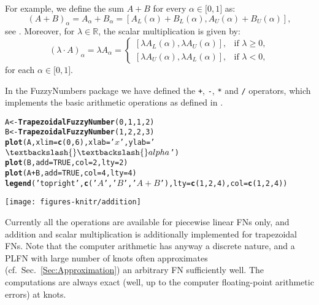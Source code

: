 \documentclass[11pt]{article}\usepackage{graphicx, color}
\makeatletter
\newcommand{\hlfunctioncall}[1]{\textcolor[rgb]{0.501960784313725,0,0.329411764705882}{\textbf{#1}}}%
\newcommand{\hlstring}[1]{\textcolor[rgb]{0.6,0.6,1}{#1}}%
\newenvironment{kframe}{%
 \def\at@end@of@kframe{}%
 \ifinner\ifhmode%
  \def\at@end@of@kframe{\end{minipage}}%
  \begin{minipage}{\columnwidth}%
 \fi\fi%
 \def\FrameCommand##1{\hskip\@totalleftmargin \hskip-\fboxsep
 \colorbox{shadecolor}{##1}\hskip-\fboxsep
     \hskip-\linewidth \hskip-\@totalleftmargin \hskip\columnwidth}%
 \MakeFramed {\advance\hsize-\width
   \@totalleftmargin\z@ \linewidth\hsize
   \@setminipage}}%
 {\par\unskip\endMakeFramed%
 \at@end@of@kframe}
\newenvironment{knitrout}{}{} %
\newcommand{\package}[1]{\textsf{#1}\xspace}
\makeatother
\begin{document}
For example, we define the sum $A+B$  for every
$\alpha \in \lbrack 0,1]$ as:%
\[
\left( A+B\right) _{\alpha }=A_{\alpha }+B_{\alpha }=\left[ A_{L}\left(
\alpha \right) +B_{L}\left( \alpha \right) ,A_{U}\left( \alpha \right)
+B_{U}\left( \alpha \right) \right],
\]%
see \cite{DuboisPrade1978:opfn,DiamondKloeden1994:metricspacesfs}.
Moreover, for $\lambda \in \mathbb{R}$,
the scalar multiplication is given by:
\[
\left( \lambda \cdot A\right) _{\alpha }=\lambda A_{\alpha }=\left\{ 
\begin{array}{ll}
\left[ \lambda A_{L}\left( \alpha \right) ,\lambda A_{U}\left( \alpha
\right) \right] , & \text{if }\lambda \geq 0, \\ 
\left[ \lambda A_{U}\left( \alpha \right) ,\lambda A_{L}\left( \alpha
\right) \right] , & \text{if }\lambda <0,%
\end{array}%
\right. 
\]%
for each $\alpha \in \lbrack 0,1]$.



In the \package{FuzzyNumbers} package we have defined
the \texttt{+}, \texttt{-}, \texttt{*} and \texttt{/} operators,
which implements the basic arithmetic operations
as defined in \cite{KlirYuan1995:fuzzybook}.


\begin{knitrout}\small
{}\color{fgcolor}\begin{kframe}
\begin{alltt}
A <- \hlfunctioncall{TrapezoidalFuzzyNumber}(0, 1, 1, 2)
B <- \hlfunctioncall{TrapezoidalFuzzyNumber}(1, 2, 2, 3)
\hlfunctioncall{plot}(A, xlim=\hlfunctioncall{c}(0,6), xlab=\hlstring{'$x$'}, ylab=\hlstring{'$\textbackslash{}\textbackslash{}alpha$'})
\hlfunctioncall{plot}(B, add=TRUE, col=2, lty=2)
\hlfunctioncall{plot}(A+B, add=TRUE, col=4, lty=4)
\hlfunctioncall{legend}(\hlstring{'topright'}, \hlfunctioncall{c}(\hlstring{'$A$'}, \hlstring{'$B$'}, \hlstring{'$A+B$'}), lty=\hlfunctioncall{c}(1,2,4), col=\hlfunctioncall{c}(1,2,4))
\end{alltt}
\end{kframe}

{\centering \texttt{[image: figures-knitr/addition]} 

}



\end{knitrout}



Currently all the operations are available
for piecewise linear FNs only,
and addition and scalar multiplication
is additionally implemented for trapezoidal FNs.
Note that the computer arithmetic has anyway
a discrete nature, and a PLFN with large number
of knots often approximates (cf.~Sec.~\ref{Sec:Approximation})
an arbitrary FN sufficiently well.
The computations are always exact (well, up to the computer
floating-point arithmetic errors) at knots.
\end{document}
